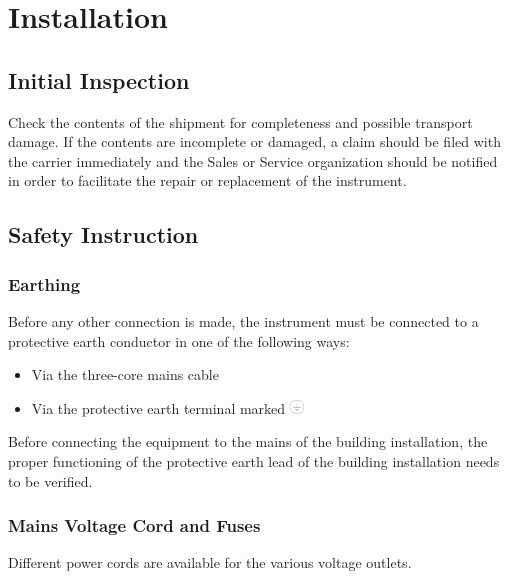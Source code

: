 \section{Installation}
\label{cha:Installation}

\subsection{Initial Inspection}
Check the contents of the shipment for completeness and possible transport damage. If the contents are incomplete or damaged, a claim should be filed with the carrier immediately and the \Firma{} Sales or Service organization should be notified in order to facilitate the repair or replacement of the instrument.

\subsection{Safety Instruction}
\subsubsection{Earthing}
Before any other connection is made, the instrument must be connected to a protective earth conductor in one of the following ways:
\begin{itemize}
\item Via the three-core mains cable
\item Via the protective earth terminal marked \includegraphics[width=1em]{fig/ground_symbol}
\end{itemize}

Before connecting the equipment to the mains of the building installation, the proper functioning of the protective earth lead of the building installation needs to be verified.

\begin{center}
\end{center}

\subsubsection{Mains Voltage Cord and Fuses}
Different power cords are available for the various voltage outlets.

